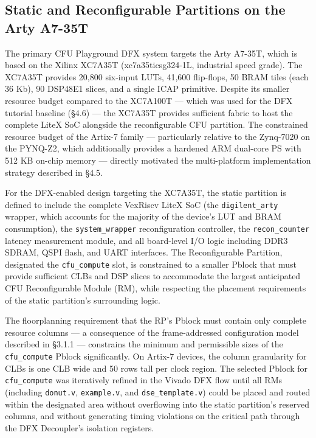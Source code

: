 \subsection{Static and Reconfigurable Partitions on the Arty A7-35T}

The primary CFU Playground DFX system targets the Arty A7-35T, which is based on the Xilinx XC7A35T (xc7a35ticsg324-1L, industrial speed grade). The XC7A35T provides 20,800 six-input LUTs, 41,600 flip-flops, 50 BRAM tiles (each 36 Kb), 90 DSP48E1 slices, and a single ICAP primitive. Despite its smaller resource budget compared to the XC7A100T — which was used for the DFX tutorial baseline (§4.6) — the XC7A35T provides sufficient fabric to host the complete LiteX SoC alongside the reconfigurable CFU partition. The constrained resource budget of the Artix-7 family — particularly relative to the Zynq-7020 on the PYNQ-Z2, which additionally provides a hardened ARM dual-core PS with 512 KB on-chip memory — directly motivated the multi-platform implementation strategy described in §4.5.

For the DFX-enabled design targeting the XC7A35T, the static partition is defined to include the complete VexRiscv LiteX SoC (the \texttt{digilent\_arty} wrapper, which accounts for the majority of the device's LUT and BRAM consumption), the \texttt{system\_wrapper} reconfiguration controller, the \texttt{recon\_counter} latency measurement module, and all board-level I/O logic including DDR3 SDRAM, QSPI flash, and UART interfaces. The Reconfigurable Partition, designated the \texttt{cfu\_compute} slot, is constrained to a smaller Pblock that must provide sufficient CLBs and DSP slices to accommodate the largest anticipated CFU Reconfigurable Module (RM), while respecting the placement requirements of the static partition's surrounding logic.

The floorplanning requirement that the RP's Pblock must contain only complete resource columns — a consequence of the frame-addressed configuration model described in §3.1.1 — constrains the minimum and permissible sizes of the \texttt{cfu\_compute} Pblock significantly. On Artix-7 devices, the column granularity for CLBs is one CLB wide and 50 rows tall per clock region. The selected Pblock for \texttt{cfu\_compute} was iteratively refined in the Vivado DFX flow until all RMs (including \texttt{donut.v}, \texttt{example.v}, and \texttt{dse\_template.v}) could be placed and routed within the designated area without overflowing into the static partition's reserved columns, and without generating timing violations on the critical path through the DFX Decoupler's isolation registers.


